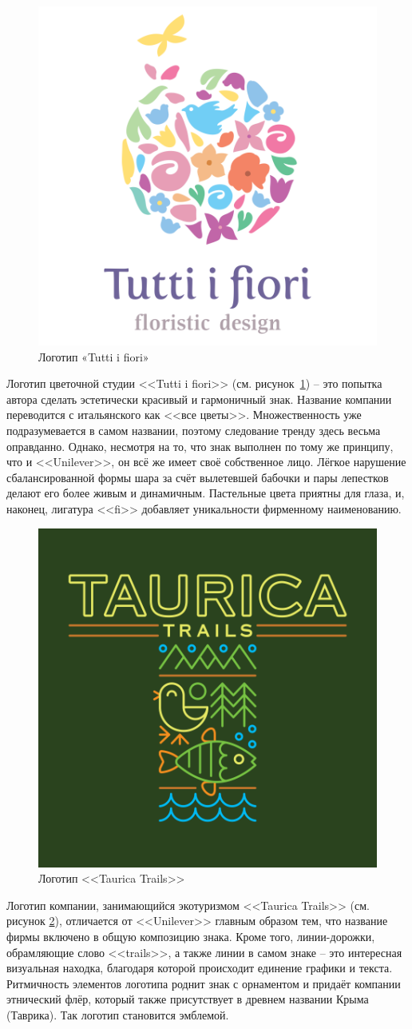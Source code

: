 \begin{figure}[h!]
  \centering
  \includegraphics[width=.3\linewidth]{images/tutti}
  \caption{Логотип «Tutti i fiori»}
  \label{fig:tutti}
\end{figure}

Логотип цветочной студии <<Tutti i fiori>> (см. рисунок~\ref{fig:tutti}) -- это попытка автора сделать эстетически красивый и гармоничный знак. Название компании переводится с итальянского как <<все цветы>>. Множественность уже подразумевается в самом названии, поэтому следование тренду здесь весьма оправданно. Однако, несмотря на то, что знак выполнен по тому же принципу, что и <<Unilever>>, он всё же имеет своё собственное лицо. Лёгкое нарушение сбалансированной формы шара за счёт вылетевшей бабочки и пары лепестков делают его более живым и динамичным. Пастельные цвета приятны для глаза, и, наконец, лигатура <<fi>> добавляет уникальности фирменному наименованию.

\begin{figure}[h!]
  \centering
  \includegraphics[width=.3\linewidth]{images/taurica}
  \caption{Логотип <<Taurica Trails>>}
  \label{fig:taurica}
\end{figure}

Логотип компании, занимающийся экотуризмом <<Taurica Trails>> (см. рисунок \ref{fig:taurica}), отличается от <<Unilever>> главным образом тем, что название фирмы включено в общую композицию знака. Кроме того, линии-дорожки, обрамляющие слово <<trails>>, а также линии в самом знаке -- это интересная визуальная находка, благодаря которой происходит единение графики и текста. Ритмичность элементов логотипа роднит знак с орнаментом и придаёт компании этнический флёр, который также присутствует в древнем названии Крыма (Таврика). Так логотип становится эмблемой.


